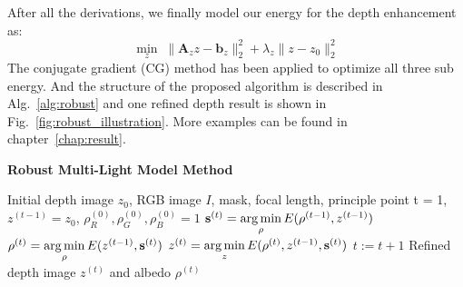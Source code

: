 After all the derivations, we finally model our energy for the depth enhancement as:
 \begin{equation}\label{eq:robust_depth_estimate}
	\min_{z} \; \lVert  \mathbf{A}_{z}z - \mathbf{b}_z\rVert^2_2 + \lambda_{z}\lVert z - z_0 \rVert_2^2
\end{equation}
The conjugate gradient (CG) method has been applied to optimize all three sub energy.
And the structure of the proposed algorithm is described in Alg.~\ref{alg:robust} and one refined depth result is shown in Fig.~\ref{fig:robust_illustration}.
More examples can be found in chapter~\ref{chap:result}.

\begin{algorithm}[!htbp]
	\begin{algorithmic}[1] 
  		\caption{\textbf{Robust Multi-Light Model Method}}
		\label{alg:robust}
		 \renewcommand{\algorithmicrequire}{\textbf{Input:}}
		 \renewcommand{\algorithmicensure}{\textbf{Output:}}
		 \REQUIRE Initial depth image $z_0$, RGB image $I$, mask, focal length, principle point
		 \vspace{1.8mm}
		 \STATE t = 1, $z^{(t-1)} = z_0$, $\rho^{(0)}_R, \rho^{(0)}_G, \rho^{(0)}_B = 1$
		 \vspace{1.8mm}
		       \vspace{1.8mm}
		        \STATE $\mathbf{s}^{(t)} = \operatorname*{arg\,min} \limits_{\rho} E(\rho^{(t-1)}, z^{(t-1)})$ 
			\STATE $\rho^{(t)} = \operatorname*{arg\,min} \limits_{\rho} E(z^{(t-1)}, \mathbf{s}^{(t)})$ 
			  \STATE $z^{(t)} = \operatorname*{arg\,min} \limits_{z} E(\rho^{(t)}, z^{(t-1)}, \mathbf{s}^{(t)})$ 
			  \vspace{1.8mm}
		          \STATE $t := t + 1$
		 \vspace{1.8mm}
		  \ENDWHILE
		  \ENSURE  Refined depth image $z^{(t)}$ and albedo $\rho^{(t)}$
	\end{algorithmic}
\end{algorithm}




